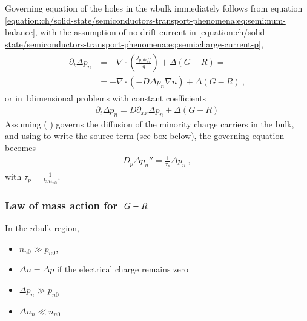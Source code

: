 \documentclass[letterpaper,10pt,english]{jupyterBook}
\begin{document}
\sphinxAtStartPar
Governing equation of the holes in the \(n\)\sphinxhyphen{}bulk immediately follows from equation \eqref{equation:ch/solid-state/semiconductors-transport-phenomena:eq:semi:num-balance}, with the assumption of no drift current in \eqref{equation:ch/solid-state/semiconductors-transport-phenomena:eq:semi:charge-current-p},
\begin{equation*}
\begin{split}\begin{aligned}
  \partial_t \Delta p_n  
  & = - \nabla \cdot \left( \frac{j_{p,diff}}{q} \right) + \Delta ( G - R ) = \\
  & = - \nabla \cdot \left( - D \Delta p_n \nabla n \right) + \Delta ( G - R ) \ ,
\end{aligned}\end{split}
\end{equation*}
\sphinxAtStartPar
or in 1\sphinxhyphen{}dimensional problems with constant coefficients
\begin{equation*}
\begin{split}\partial_t \Delta p_n = D \partial_{xx} \Delta p_n + \Delta ( G - R )\end{split}
\end{equation*}
\sphinxAtStartPar
Assuming  ( ) governs the diffusion of the minority charge carriers in the bulk, and using  to write the source term (see box below), the governing equation becomes
\begin{equation*}
\begin{split}D_p \Delta p_n'' = \frac{1}{\tau_p} \Delta p_n \ ,\end{split}
\end{equation*}
\sphinxAtStartPar
with \(\tau_p = \frac{1}{k_r n_{n0}}\).
\subsubsection*{Law of mass action for \protect\(\ G - R\protect\)}

\sphinxAtStartPar
In the \(n\)\sphinxhyphen{}bulk region,
\begin{itemize}
\item {} 
\sphinxAtStartPar
\(n_{n0} \gg p_{n0}\),

\item {} 
\sphinxAtStartPar
\(\Delta n = \Delta p\) if the electrical charge remains zero

\item {} 
\sphinxAtStartPar
\(\Delta p_n \gg p_{n0}\)

\item {} 
\sphinxAtStartPar
\(\Delta n_n \ll n_{n0}\)

\end{itemize}
\end{document}
